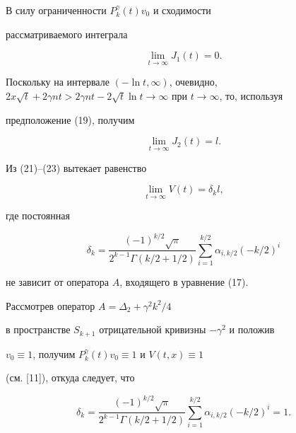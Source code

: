 В силу ограниченности $P_k^\gamma(t)v_0$ и сходимости 


рассматриваемого интеграла


\begin{equation}


\lim_{t\to\infty}J_1(t)=0.


\end{equation}


Поскольку на интервале $(-\ln t,\infty)$, очевидно, $ 2x\sqrt{t}+2\gamma nt>


2\gamma nt-2\sqrt{t}\ln t\to\infty$ при $t\to\infty$, то, используя


предположение (19), получим


\begin{equation}


\lim_{t\to\infty}J_2(t)=l.


\end{equation}


Из (21)--(23) вытекает равенство


\begin{equation}


\lim_{t\to\infty}V(t)=\delta_kl,


\end{equation}


где постоянная


$$


\delta_k=\frac{(-1)^{k/2}\sqrt{\pi}}{2^{k-1}\Gamma(k/2+1/2)}


\sum_{i=1}^{k/2}\alpha_{i,k/2}(-k/2)^i


$$


не зависит от оператора $A$, входящего в уравнение (17).





Рассмотрев оператор $A=\Delta_2+\gamma^2 k^2/4$


в пространстве $S_{k+1}$ отрицательной кривизны $-\gamma^2$ и положив


$v_0\equiv 1$, получим $P_k^\gamma(t)v_0\equiv 1$ и $V(t,x)\equiv 1$


(см. [11]), откуда следует, что


\begin{equation}


\delta_k=\frac{(-1)^{k/2}\sqrt{\pi}}{2^{k-1}\Gamma(k/2+1/2)}


\sum_{i=1}^{k/2}\alpha_{i,k/2}(-k/2)^i=1.


\end{equation}





